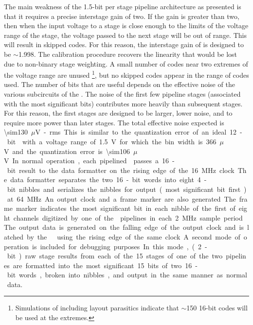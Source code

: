 The main weakness of the \num{1.5}-bit per stage pipeline architecture as presented
is that it requires a precise interstage gain of two.  If the gain is greater
than two, then when the input voltage to a stage is close enough to the limits
of the voltage range of the stage, the voltage passed to the next stage will be
out of range.  This will result in skipped  codes.  For this reason,
the interstage gain of  is designed to be $\sim$\num{1.998}.  The
calibration procedure recovers the linearity that would be lost due to
non-binary stage weighting.  A small number of  codes near two
extremes of the voltage range are unused \footnote{Simulations of 
including layout parasitics indicate that $\sim$\num{150} \num{16}-bit codes will be
used at the extremes.}, but no skipped codes appear in the range of codes
used.  The number of  bits that are useful depends on the effective
noise of the various subcircuits of the .  The noise of the first few
pipeline stages (associated with the most significant bits) contributes more
heavily than subsequent stages.  For this reason, the first stages are designed
to be larger, lower noise, and to require more power than later stages.  The total
effective noise expected is \SI{\sim130}{$\mu$V}-rms.  This is similar to the
quantization error of an ideal \num{12}-bit  with a voltage range of
\SI{1.5}{V} for which the bin width is \SI{366}{$\mu$V} and the quantization
error is \SI{\sim106}{$\mu$V}.

In normal operation, each pipelined  passes a \num{16}-bit result to the
data formatter on the rising edge of the \SI{16}{MHz} clock.  The data formatter
separates the two 16-bit words into eight \num{4}-bit nibbles and serializes the
nibbles for output (most significant bit first) at \SI{64}{MHz}.  An output
clock and a frame marker are also generated.  The frame marker indicates the most
significant bit in each nibble of the first of eight channels digitized by one
of the  pipelines in each \SI{2}{MHz} sample period.  The output data
is generated on the falling edge of the output clock and is latched by the
  using the rising edge of the same clock.  A second
mode of operation is included for debugging purposes.  In this mode, (\num{2}-bit) raw
stage results from each of the \num{15} stages of one of the two pipelines are formatted
into the most significant \num{15} bits of two \num{16}-bit words, broken into nibbles, and
output in the same manner as normal data.

